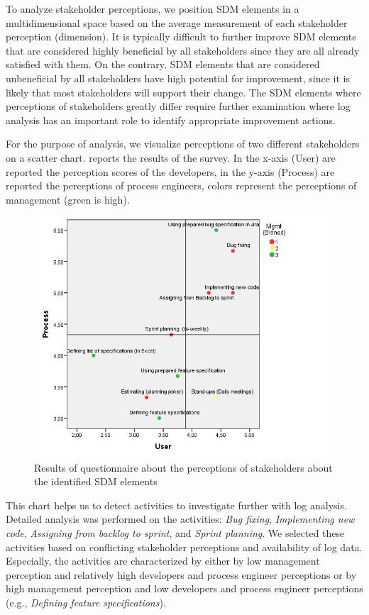 To analyze stakeholder perceptions, we position SDM elements in a multidimensional space based on the average measurement of each stakeholder perception (dimension). It is typically difficult to further improve SDM elements that are considered highly beneficial by all stakeholders since they are all already satisfied with them. On the contrary, SDM elements that are considered unbeneficial by all stakeholders have high potential for improvement, since it is likely that most stakeholders will support their change. The SDM elements where perceptions of stakeholders greatly differ require further examination where log analysis has an important role to identify appropriate improvement actions.

For the purpose of analysis, we visualize perceptions of two different stakeholders on a scatter chart.  reports the results of the survey. In the x-axis (User) are reported the perception scores of the developers, in the y-axis (Process) are reported the perceptions of process engineers, colors represent the perceptions of management (green is high).


\begin{figure}
	\centering
	\includegraphics[width=\linewidth]{figures/survey-scatter-plot}
	\caption[Survey results on user perceptions]{Results of questionnaire about the perceptions of stakeholders about the identified SDM elements}
	\label{fig:survey-scatter-plot}
\end{figure}

This chart helps us to detect activities to investigate further with log analysis. Detailed analysis was performed on the activities: \emph{Bug fixing}, \emph{Implementing new code}, \emph{Assigning from backlog to sprint}, and \emph{Sprint planning}. We selected these activities based on conflicting stakeholder perceptions and availability of log data. Especially, the activities are characterized by either by low management perception and relatively high developers and process engineer perceptions or by high management perception and low developers and process engineer perceptions (e.g., \emph{Defining feature specifications}).

